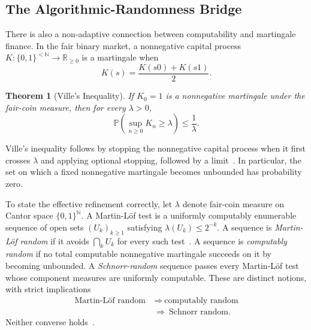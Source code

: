 \documentclass[aps,pra,reprint,superscriptaddress,amsmath,amssymb,floatfix]{revtex4-2}
\theoremstyle{plain}
\newtheorem{theorem}{Theorem}
\theoremstyle{definition}
\theoremstyle{remark}
\begin{document}
\subsection{The Algorithmic-Randomness Bridge}

There is also a non-adaptive connection between computability and martingale
finance. In the fair binary market, a nonnegative capital process
\(K\colon\{0,1\}^{<\mathbb{N}}\to\mathbb{R}_{\geq0}\) is a martingale when
\begin{equation}
  K(s)=\frac{K(s0)+K(s1)}2.
  \label{eq:computablemartingale}
\end{equation}

\begin{theorem}[Ville's Inequality]
  \label{thm:ville}
  If \(K_0=1\) is a nonnegative martingale under the fair-coin measure, then
  for every \(\lambda>0\),
  \begin{equation}
    \mathbb{P}\!\left(\sup_{n\geq0}K_n\geq\lambda\right)
    \leq\frac1\lambda.
    \label{eq:ville}
  \end{equation}
\end{theorem}

Ville's inequality follows by stopping the nonnegative capital process when it
first crosses \(\lambda\) and applying optional stopping, followed by a
limit~\cite{Ville1939}. In particular, the set on which a fixed nonnegative
martingale becomes unbounded has probability zero.

To state the effective refinement correctly, let \(\lambda\) denote fair-coin
measure on Cantor space \(\{0,1\}^{\mathbb N}\). A Martin-L\"of test is a
uniformly computably enumerable sequence of open sets
\((U_k)_{k\geq1}\) satisfying \(\lambda(U_k)\leq2^{-k}\). A sequence is
\emph{Martin-L\"of random} if it avoids \(\bigcap_k U_k\) for every such
test~\cite{MartinLof1966}. A sequence is \emph{computably random} if no total
computable nonnegative martingale succeeds on it by becoming unbounded. A
\emph{Schnorr-random} sequence passes every Martin-L\"of test whose component
measures are uniformly computable. These are distinct notions, with strict
implications
\begin{equation}
  \begin{aligned}
    \text{Martin-L\"of random}
      &\ \Longrightarrow\ \text{computably random}\\
      &\ \Longrightarrow\ \text{Schnorr random}.
  \end{aligned}
  \label{eq:randomhierarchy}
\end{equation}
Neither converse holds~\cite{schnorr1,Nies2009,DH}.
\end{document}
